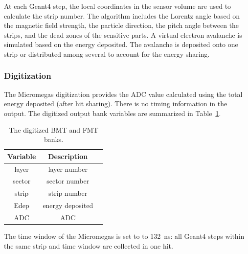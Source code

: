 At each Geant4 step, the local coordinates in the sensor volume are used to calculate the strip number. The algorithm
includes the Lorentz angle based on the magnetic field strength, the particle direction, the pitch angle between the
strips, and the dead zones of the sensitive parts. A virtual electron avalanche is simulated based on the energy
deposited. The avalanche is deposited onto one strip or distributed among several to account for the energy sharing.

\subsubsection{Digitization}

The Micromegas digitization provides the ADC value calculated using the total energy deposited (after hit sharing).
There is no timing information in the output. The digitized output bank variables are summarized in Table~\ref{tab:mmBank}.

\begin{table}[h]
	\begin{center}
		\begin{tabular}{| c | c | c |}
			\hline \hline
			Variable & Description  \\
			\hline
              layer  &      layer number   \\
             sector  &     sector number   \\
              strip  &      strip number   \\
               Edep  &  energy deposited   \\
                ADC  &               ADC   \\
			\hline \hline
		\end{tabular}
	\end{center}
	\caption{The digitized BMT and FMT banks.}
        \label{tab:mmBank}
\end{table}

The time window  of the Micromegas is set to to 132~ns: all Geant4 steps within the same strip and time window are
collected in one hit.

